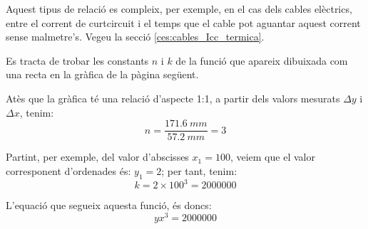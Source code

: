Aquest tipus de relació es compleix, per exemple, en el cas dels cables elèctrics, entre el corrent de curtcircuit i el temps que el cable pot aguantar aquest corrent sense malmetre's. Vegeu la secció \vref{ces:cables_Icc_termica}.

	
\begin{exemple}[\ConstantsEscalaLogLog{}]
	\addcontentsxms{\ConstantsEscalaLogLog}
    Es tracta de trobar les constants $n$ i $k$ de la funció que apareix dibuixada com una recta en la gràfica de la pàgina següent.

     Atès que la gràfica té una relació d'aspecte 1:1, a partir dels valors mesurats $\Delta{}y$ i $\Delta{}x$, tenim:
    \[
        n = \frac{\qty{171,6}{mm}}{\qty{57,2}{mm}} = 3
    \]

    Partint, per exemple, del valor d'abscisses $x_1=100$, veiem que el valor corresponent d'ordenades és: $y_1=2$;  per tant, tenim:
    \[
        k = 2 \times 100^3  = \num{2000000}
    \]

    L'equació que segueix aquesta funció, és doncs:
    \[
        y x^3 = \num{2000000}
    \]

   \begin{center}
        
   \end{center}

\end{exemple}

